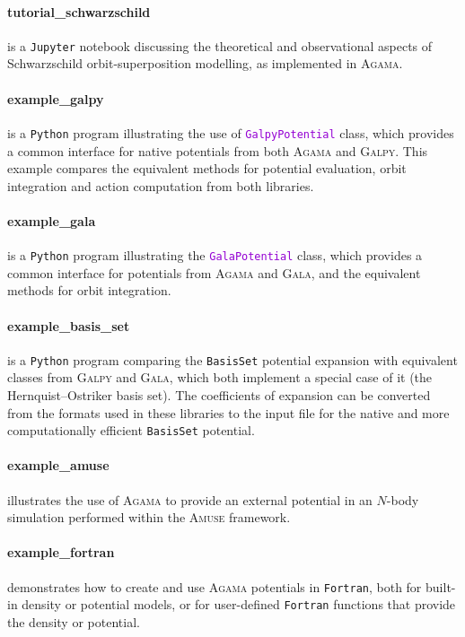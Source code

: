 \documentclass[12pt]{article}
\newcommand{\Agama}{\textsc{Agama}\xspace}
\newcommand{\Amuse}{\textsc{Amuse}\xspace}
\newcommand{\Galpy}{\textsc{Galpy}\xspace}
\newcommand{\Gala} {\textsc{Gala}\xspace}
\newcommand{\Python}{\texttt{Python}\xspace}
\newcommand{\Fortran}{\texttt{Fortran}\xspace}
\newcommand{\ttt}[1]{\textcolor{darkviolet}{\texttt{#1}}}
\newcommand{\ppp}[1]{\textcolor{darkolive} {\texttt{#1}}}
\let\oldparagraph\paragraph
\renewcommand{\paragraph}[1]{\vspace{-2mm}\oldparagraph{#1}}
\begin{document}
\paragraph{tutorial_schwarzschild} is a \texttt{Jupyter} notebook discussing the theoretical and observational aspects of Schwarzschild orbit-superposition modelling, as implemented in \Agama.

\paragraph{example_galpy} is a \Python program illustrating the use of \ttt{GalpyPotential} class, which provides a common interface for native potentials from both \Agama and \Galpy. This example compares the equivalent methods for potential evaluation, orbit integration and action computation from both libraries.

\paragraph{example_gala} is a \Python program illustrating the \ttt{GalaPotential} class, which provides a common interface for potentials from \Agama and \Gala, and the equivalent methods for orbit integration.

\paragraph{example_basis_set} is a \Python program comparing the \ppp{BasisSet} potential expansion with equivalent classes from \Galpy and \Gala, which both implement a special case of it (the Hernquist--Ostriker basis set). The coefficients of expansion can be converted from the formats used in these libraries to the input file for the native and more computationally efficient \ppp{BasisSet} potential.

\paragraph{example_amuse} illustrates the use of \Agama to provide an external potential in an $N$-body simulation performed within the \Amuse framework.

\paragraph{example_fortran} demonstrates how to create and use \Agama potentials in \Fortran, both for built-in density or potential models, or for user-defined \Fortran functions that provide the density or potential.
\end{document}
